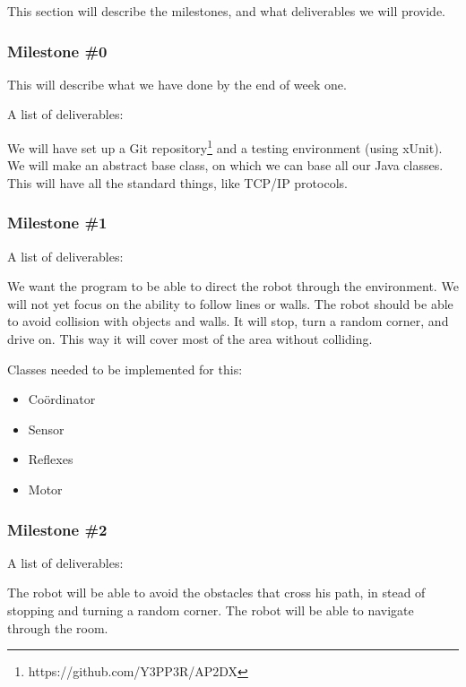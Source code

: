 This section will describe the milestones, and what deliverables we will provide. 

\subsubsection*{Milestone \#0}
This will describe what we have done by the end of week one.

A list of deliverables:
\begin{itemize}
 We will have set up a Git
repository\footnote{https://github.com/Y3PP3R/AP2DX} and a testing environment
(using xUnit).
 We will make an abstract base class, on which we can base
all our Java classes. This will have all the standard things, like TCP/IP
protocols.
\end{itemize}

\subsubsection*{Milestone \#1}
A list of deliverables:
\begin{itemize}
 We want the program to be able to direct
the robot through the environment. We will not yet focus on the ability to
follow lines or walls.
 The robot should be able to avoid collision with objects
and walls. It will stop, turn a random corner, and drive on. This way it will
cover most of the area without colliding.
\end{itemize}

Classes needed to be implemented for this:
\begin{itemize}
\item Co\"ordinator
\item Sensor
\item Reflexes
\item Motor
\end{itemize}

\subsubsection*{Milestone \#2}
A list of deliverables:
\begin{itemize}
 The robot will be able to avoid the obstacles that
cross his path, in stead of stopping and turning a random corner.
 The robot will be able to navigate through the room.
\end{itemize}

